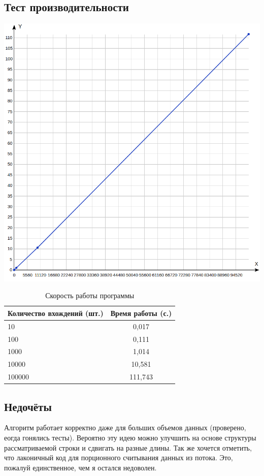 \documentclass[12pt]{article}
\begin{document}
\subsection*{Тест производительности}

\begin{center}
    \includegraphics[width=\linewidth]{graph.png}
\end{center}

\begin{table}[H]
\caption{Скорость работы программы}
\label{tabular:timesandtenses}
\begin{center}
\begin{tabular}{|l|c|}
\hline
\textbf{Количество вхождений (шт.)} & \textbf{Время работы (с.)} \\
\hline
10 & 0,017 \\
\hline
100 & 0,111 \\
\hline
1000 & 1,014 \\
\hline
10000 & 10,581 \\
\hline
100000 & 111,743 \\
\hline
\end{tabular}
\end{center}
\end{table}

\subsection*{Недочёты}
Алгоритм работает корректно даже для больших объемов данных (проверено, еогда гонялись тесты). Вероятно эту идею можно улучшить на основе структуры рассматриваемой строки и сдвигать на разные длины. Так же хочется отметить, что лаконичный код для порционного считывания данных из потока. Это, пожалуй единственное, чем я остался недоволен.
\end{document}
